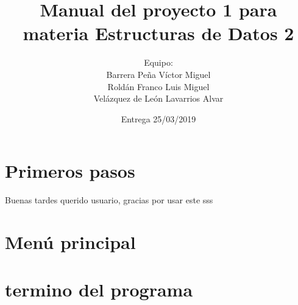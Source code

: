 \documentclass{report}
\title{Manual del proyecto 1 para materia Estructuras de Datos 2}
\author{
	Equipo:\\
	Barrera Peña Víctor Miguel \\
	Roldán Franco Luis Miguel \\
	Velázquez de León Lavarrios Alvar 
}
\date{Entrega 25/03/2019}
\begin{document}
	\maketitle
	\chapter{Primeros pasos}
	Buenas tardes querido usuario, gracias por usar este 
	sss
	
	\chapter{Menú principal}
	\chapter{termino del programa}
\end{document}
